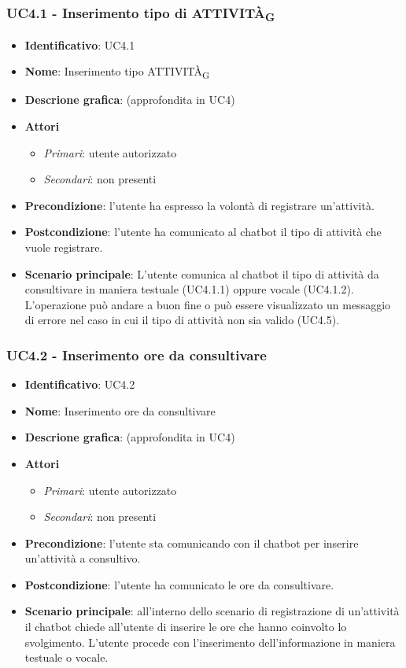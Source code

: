\newpage

\subsubsection{UC4.1 - Inserimento tipo di ATTIVITÀ\textsubscript{G}}

\begin{itemize}
    \item \textbf{Identificativo}: UC4.1 
    \item \textbf{Nome}: Inserimento tipo ATTIVITÀ\textsubscript{G} 
    \item \textbf{Descrione grafica}: (approfondita in UC4)
    \item \textbf{Attori}
        \begin{itemize} 
            \item \textit{Primari}: utente autorizzato
            \item \textit{Secondari}: non presenti
        \end{itemize}
    \item \textbf{Precondizione}: l'utente ha espresso la volontà di registrare un'attività. 
    \item \textbf{Postcondizione}: l'utente ha comunicato al chatbot il tipo di attività che vuole registrare. 
    \item \textbf{Scenario principale}: L'utente comunica al chatbot il tipo di attività da consultivare in maniera testuale (UC4.1.1) oppure vocale (UC4.1.2). L'operazione può andare a buon fine o può essere visualizzato un messaggio di errore nel caso in cui il tipo di attività non sia valido (UC4.5).
\end{itemize}

\subsubsection{UC4.2 - Inserimento ore da consultivare}
\begin{itemize}
    \item \textbf{Identificativo}: UC4.2 
    \item \textbf{Nome}: Inserimento ore da consultivare  
    \item \textbf{Descrione grafica}: (approfondita in UC4)
    \item \textbf{Attori}
        \begin{itemize} 
            \item \textit{Primari}: utente autorizzato
            \item \textit{Secondari}: non presenti
        \end{itemize}
    \item \textbf{Precondizione}: l'utente sta comunicando con il chatbot per inserire un'attività a consultivo. 
    \item \textbf{Postcondizione}: l'utente ha comunicato le ore da consultivare. 
    \item \textbf{Scenario principale}: all'interno dello scenario di registrazione di un'attività il chatbot chiede all'utente di inserire le ore che hanno coinvolto lo svolgimento. L'utente procede con l'inserimento dell'informazione in maniera testuale o vocale. 
\end{itemize}
\newpage

